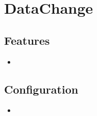 \section{DataChange}
\label{module:DataChange}
\ClearAPI
\TODO
\subsection{Features}
\begin{itemize}
	\item {}
\end{itemize}

\subsection{Configuration}
\begin{itemize}
	\item {}
\end{itemize}
